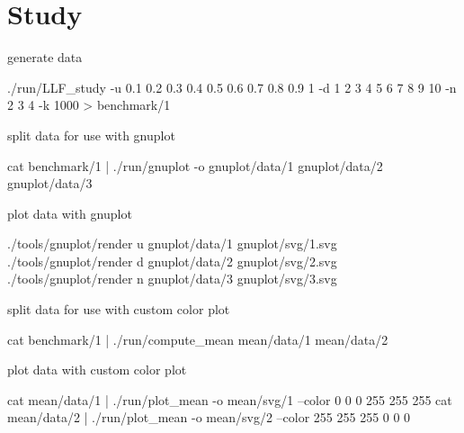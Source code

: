 \section{Study}

	generate data

	./run/LLF_study -u 0.1 0.2 0.3 0.4 0.5 0.6 0.7 0.8 0.9 1 -d 1 2 3 4 5 6 7 8 9 10 -n 2 3 4 -k 1000 > benchmark/1

	split data for use with gnuplot

	cat benchmark/1 | ./run/gnuplot -o gnuplot/data/1 gnuplot/data/2 gnuplot/data/3

	plot data with gnuplot

	./tools/gnuplot/render u gnuplot/data/1 gnuplot/svg/1.svg
	./tools/gnuplot/render d gnuplot/data/2 gnuplot/svg/2.svg
	./tools/gnuplot/render n gnuplot/data/3 gnuplot/svg/3.svg

	split data for use with custom color plot

	cat benchmark/1 | ./run/compute_mean mean/data/1 mean/data/2

	plot data with custom color plot

	cat mean/data/1 | ./run/plot_mean -o mean/svg/1 --color 0 0 0 255 255 255
	cat mean/data/2 | ./run/plot_mean -o mean/svg/2 --color 255 255 255 0 0 0